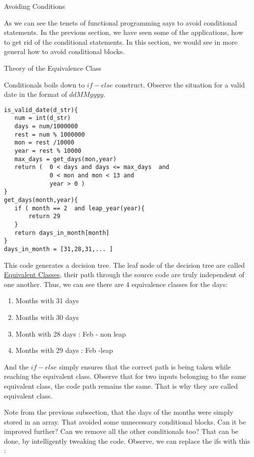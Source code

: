 \begin{section}{Avoiding Conditions}

As we can see the tenets of functional programming says to avoid conditional statements.
In the previous section, we have seen some of the applications, how to get rid of the conditional statements.
In this section, we would see in more general how to avoid conditional blocks.


\begin{subsection}{Theory of the Equivalence Class}

Conditionals boils down to $if-else$ construct.
Observe the situation for a valid date in the format of $ddMMyyyy$.

\begin{lstlisting}[style=JexlStyle]
is_valid_date(d_str){
   num = int(d_str) 
   days = num/1000000
   rest = num % 1000000
   mon = rest /10000
   year = rest % 10000 
   max_days = get_days(mon,year)  
   return (  0 < days and days <= max_days  and 
             0 < mon and mon < 13 and 
             year > 0 )      
}
get_days(month,year){
   if ( month == 2  and leap_year(year){
       return 29
   }
   return days_in_month[month] 
}
days_in_month = [31,28,31,... ]
\end{lstlisting}

This code generates a decision tree. The leaf node of the decision tree are
called \href{https://en.wikipedia.org/wiki/Equivalence\_partitioning}{Equivalent Classes}, 
their path through the source code are truly independent of one another.  
Thus, we can see there are 4 equivalence classes for the days:

\begin{enumerate}
\item{Months with 31 days}
\item{Months with 30 days}
\item{Month with 28 days : Feb - non leap}
\item{Months with 29 days : Feb -leap }
\end{enumerate}
 
And the $if - else$ simply ensures that the correct path is being taken
while reaching the equivalent class. Observe that for two inputs belonging 
to the same equivalent class, the code path remains the same.
That is why they are called equivalent class.

Note from the previous subsection, that the days of the months were simply stored
in an array. That avoided some unnecessary conditional blocks.
Can it be improved further? Can we remove all the other conditionals too?
That can be done, by intelligently tweaking the code.
Observe, we can replace the ifs with this :


\end{subsection}
\end{section}
